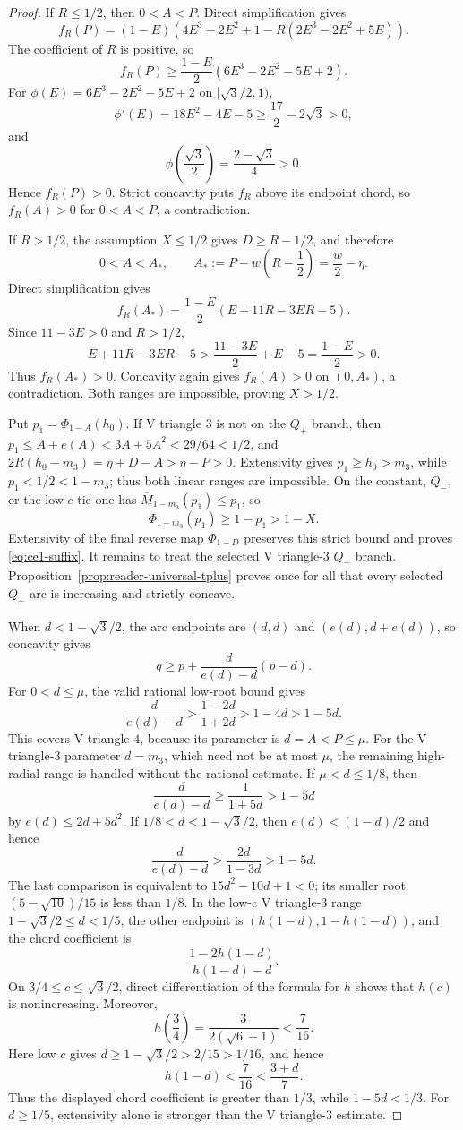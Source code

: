 \begin{proof}
If $R\le1/2$, then $0<A<P$.  Direct simplification gives
\[
 f_R(P)
 =(1-E)\left(
 4E^3-2E^2+1-R(2E^3-2E^2+5E)
 \right).
\]
The coefficient of $R$ is positive, so
\[
 f_R(P)\ge
 \frac{1-E}{2}\left(6E^3-2E^2-5E+2\right).
\]
For $\phi(E)=6E^3-2E^2-5E+2$ on
$[\sqrt3/2,1)$,
\[
 \phi'(E)=18E^2-4E-5
 \ge\frac{17}{2}-2\sqrt3>0,
\]
and
\[
 \phi\left(\frac{\sqrt3}{2}\right)
 =\frac{2-\sqrt3}{4}>0.
\]
Hence $f_R(P)>0$.  Strict concavity puts $f_R$ above its endpoint chord,
so $f_R(A)>0$ for $0<A<P$, a contradiction.

If $R>1/2$, the assumption $X\le1/2$ gives
$D\ge R-1/2$, and therefore
\[
 0<A<A_*,
 \qquad
 A_*:=P-w\left(R-\frac12\right)=\frac w2-\eta.
\]
Direct simplification gives
\[
 f_R(A_*)
 =\frac{1-E}{2}(E+11R-3ER-5).
\]
Since $11-3E>0$ and $R>1/2$,
\[
 E+11R-3ER-5
 >\frac{11-3E}{2}+E-5
 =\frac{1-E}{2}>0.
\]
Thus $f_R(A_*)>0$.  Concavity again gives $f_R(A)>0$ on $(0,A_*)$, a
contradiction.  Both ranges are impossible, proving $X>1/2$.

Put $p_1=\Phi_{1-A}(h_0)$. If V triangle $3$ is not on the $Q_+$ branch, then
$p_1\le A+e(A)<3A+5A^2<29/64<1/2$, and
$2R(h_0-m_3)=\eta+D-A>\eta-P>0$. Extensivity gives
$p_1\ge h_0>m_3$, while $p_1<1/2<1-m_3$; thus both linear ranges are impossible.
On the constant, $Q_-$, or the low-$c$ tie one has $\overline M_{1-m_3}(p_1)\le p_1$, so
\[
 \Phi_{1-m_3}(p_1)\ge1-p_1>1-X.
\]
Extensivity of the final reverse map $\Phi_{1-D}$ preserves this strict bound
and proves \eqref{eq:ce1-suffix}.  It remains to treat the selected V triangle-$3$
$Q_+$ branch.  Proposition~\ref{prop:reader-universal-tplus} proves once
for all that every selected $Q_+$ arc is increasing and strictly concave.

When $d<1-\sqrt3/2$, the arc endpoints are
$(d,d)$ and $(e(d),d+e(d))$, so concavity gives
\begin{equation}
 q\ge p+\frac{d}{e(d)-d}(p-d).
 \label{eq:ce1-selected-chord}
\end{equation}
For $0<d\le\mu$, the valid rational low-root bound gives
\[
 \frac{d}{e(d)-d}>\frac{1-2d}{1+2d}>1-4d>1-5d.
\]
This covers V triangle $4$, because its parameter is $d=A<P\le\mu$.  For the
V triangle-$3$ parameter $d=m_3$, which need not be at most $\mu$, the remaining
high-radial range is handled without the rational estimate.  If
$\mu<d\le1/8$, then
\[
 \frac{d}{e(d)-d}\ge\frac1{1+5d}>1-5d
\]
by $e(d)\le2d+5d^2$.  If
$1/8<d<1-\sqrt3/2$, then $e(d)<(1-d)/2$ and hence
\[
 \frac{d}{e(d)-d}>\frac{2d}{1-3d}>1-5d.
\]
The last comparison is equivalent to $15d^2-10d+1<0$; its smaller root
$(5-\sqrt{10})/15$ is less than $1/8$.  In the low-$c$ V triangle-$3$ range
$1-\sqrt3/2\le d<1/5$, the other endpoint is
$(h(1-d),1-h(1-d))$, and the chord coefficient is
\[
 \frac{1-2h(1-d)}{h(1-d)-d}.
\]
On $3/4\le c\le\sqrt3/2$, direct differentiation of the formula for $h$
shows that $h(c)$ is nonincreasing.  Moreover,
\[
 h\left(\frac34\right)
 =\frac{3}{2(\sqrt6+1)}<\frac7{16}.
\]
Here low $c$ gives $d\ge1-\sqrt3/2>2/15>1/16$, and hence
\[
 h(1-d)<\frac7{16}<\frac{3+d}{7}.
\]
Thus the displayed chord coefficient is greater than $1/3$, while
$1-5d<1/3$.
For $d\ge1/5$, extensivity alone is stronger than the V triangle-$3$ estimate.


\end{proof}
